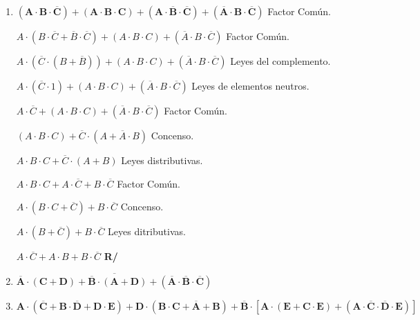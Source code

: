 \documentclass[12pt]{article}
\begin{document}
\begin{enumerate}[label = \textbf{\alph*.}]
\begin{enumerate}[label = \textbf{\arabic*.}]
                    \item $\mathbf{(A \cdot B \cdot \overline{C}) + (A \cdot B \cdot C) + (A \cdot \overline{B} \cdot \overline{C}) + (\overline{A}\cdot B \cdot \overline{C})}$ Factor Común.
                        \par$A \cdot (B \cdot \overline{C} + \overline{B} \cdot \overline{C}) + (A \cdot B \cdot C) + (\overline{A}\cdot B \cdot \overline{C})$ Factor Común.
                        \par$A \cdot (\overline{C} \cdot (B + \overline{B})) + (A \cdot B \cdot C) + (\overline{A}\cdot B \cdot \overline{C})$ Leyes del complemento.
                        \par$A \cdot (\overline{C} \cdot 1) + (A \cdot B \cdot C) + (\overline{A}\cdot B \cdot \overline{C})$ Leyes de elementos neutros.
                        \par$A \cdot \overline{C} + (A \cdot B \cdot C) + (\overline{A}\cdot B \cdot \overline{C})$ Factor Común.
                        \par$(A \cdot B \cdot C) +  \overline{C} \cdot (A + \overline{A} \cdot B)$ Concenso.
                        \par$A \cdot B \cdot C + \overline{C} \cdot (A + B)$ Leyes distributivas.
                        \par$A \cdot B \cdot C + A \cdot \overline{C} + B \cdot \overline{C}$ Factor Común.
                        \par$A \cdot (B \cdot C + \overline{C}) + B \cdot \overline{C}$ Concenso.
                        \par$A \cdot (B + \overline{C}) + B \cdot \overline{C}$ Leyes ditributivas.
                        \par$A \cdot \overline{C} + A \cdot B + B \cdot \overline{C}$ \textbf{R/}
                        \vspace{0.5cm}
                    
                    \item $\mathbf{\overline{\overline{A} \cdot (C + D) + \overline{B} \cdot (A + D) + (\overline{A} \cdot \overline{B} \cdot \overline{C})}}$
                        \vspace{0.5cm}
                    
                    \item $\mathbf{A \cdot (\overline{C} + B \cdot \overline{D} + D \cdot E) + D \cdot (B \cdot C + \overline{A} + B) + \overline{B} \cdot [A \cdot (E + C \cdot E) + (A \cdot \overline{C} \cdot \overline{D} \cdot E)]}$
                        \vspace{0.5cm}
                    

\end{enumerate}
\end{enumerate}
\end{document}

